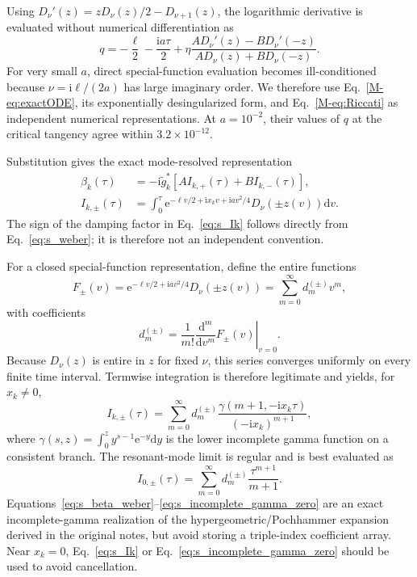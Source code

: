 \documentclass[reprint,superscriptaddress,floatfix,amsmath,amssymb,prresearch,aps]{revtex4-2}
\newcommand{\dd}{\mathrm{d}}
\newcommand{\ee}{\mathrm{e}}
\newcommand{\ii}{\mathrm{i}}
\begin{document}
Using \(D_\nu'(z)=zD_\nu(z)/2-D_{\nu+1}(z)\), the logarithmic derivative
is evaluated without numerical differentiation as
\begin{equation}
q=-\frac\ell2-\frac{\ii a\tau}{2}
+\eta\frac{A D_\nu'(z)-B D_\nu'(-z)}
{A D_\nu(z)+B D_\nu(-z)}.
\label{eq:qWeber}
\end{equation}
For very small \(a\), direct special-function evaluation becomes
ill-conditioned because \(\nu=\ii\ell/(2a)\) has large imaginary order. We
therefore use Eq.~\eqref{M-eq:exactODE}, its exponentially desingularized
form, and Eq.~\eqref{M-eq:Riccati} as independent numerical
representations. At \(a=10^{-2}\), their values of \(q\) at the critical
tangency agree within \(3.2\times10^{-12}\).

Substitution gives the exact mode-resolved representation
\begin{align}
\beta_k(\tau)&=-\ii\widetilde g_k^*
\left[A I_{k,+}(\tau)+B I_{k,-}(\tau)\right],
\label{eq:s_beta_weber}\\
I_{k,\pm}(\tau)&=\int_0^\tau
\ee^{-\ell v/2+\ii x_kv+\ii av^2/4}
D_\nu(\pm z(v))\dd v.
\label{eq:s_Ik}
\end{align}
The sign of the damping factor in Eq.~\eqref{eq:s_Ik} follows directly from
Eq.~\eqref{eq:s_weber}; it is therefore not an independent convention.

For a closed special-function representation, define the entire functions
\begin{equation}
F_\pm(v)=\ee^{-\ell v/2+\ii av^2/4}D_\nu(\pm z(v))
=\sum_{m=0}^\infty d_m^{(\pm)}v^m,
\label{eq:s_Fseries}
\end{equation}
with coefficients
\begin{equation}
d_m^{(\pm)}=\frac{1}{m!}
\left.\frac{\dd^m}{\dd v^m}F_\pm(v)\right|_{v=0}.
\label{eq:s_dm}
\end{equation}
Because \(D_\nu(z)\) is entire in \(z\) for fixed \(\nu\), this series
converges uniformly on every finite time interval. Termwise integration is
therefore legitimate and yields, for \(x_k\ne0\),
\begin{equation}
I_{k,\pm}(\tau)=\sum_{m=0}^\infty d_m^{(\pm)}
\frac{\gamma(m+1,-\ii x_k\tau)}{(-\ii x_k)^{m+1}},
\label{eq:s_incomplete_gamma}
\end{equation}
where \(\gamma(s,z)=\int_0^z y^{s-1}\ee^{-y}\dd y\) is the lower
incomplete gamma function on a consistent branch. The resonant-mode limit
is regular and is best evaluated as
\begin{equation}
I_{0,\pm}(\tau)=\sum_{m=0}^\infty
d_m^{(\pm)}\frac{\tau^{m+1}}{m+1}.
\label{eq:s_incomplete_gamma_zero}
\end{equation}
Equations~\eqref{eq:s_beta_weber}--\eqref{eq:s_incomplete_gamma_zero} are an
exact incomplete-gamma realization of the hypergeometric/Pochhammer
expansion derived in the original notes, but avoid storing a triple-index
coefficient array. Near \(x_k=0\), Eq.~\eqref{eq:s_Ik} or
Eq.~\eqref{eq:s_incomplete_gamma_zero} should be used to avoid cancellation.
\end{document}
